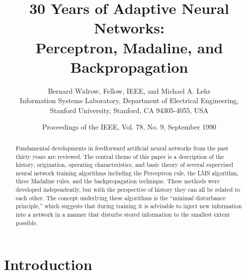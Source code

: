\documentclass[11pt,a4paper,twocolumn]{article}
\title{30 Years of Adaptive Neural Networks:\\Perceptron, Madaline, and Backpropagation}
\author{Bernard Widrow, Fellow, IEEE, and Michael A. Lehr\\
Information Systems Laboratory, Department of Electrical Engineering,\\
Stanford University, Stanford, CA 94305-4055, USA}
\date{Proceedings of the IEEE, Vol. 78, No. 9, September 1990}
\begin{document}
\maketitle
\begin{abstract}
Fundamental developments in feedforward artificial neural networks
from the past thirty years are reviewed. The central theme of this
paper is a description of the history, origination, operating
characteristics, and basic theory of several supervised neural
network training algorithms including the Perceptron rule, the LMS
algorithm, three Madaline rules, and the backpropagation technique.
These methods were developed independently, but with the perspective
of history they can all be related to each other. The concept
underlying these algorithms is the ``minimal disturbance principle,''
which suggests that during training it is advisable to inject new
information into a network in a manner that disturbs stored
information to the smallest extent possible.
\end{abstract}
\tableofcontents
\newpage


\section{Introduction}
\end{document}
